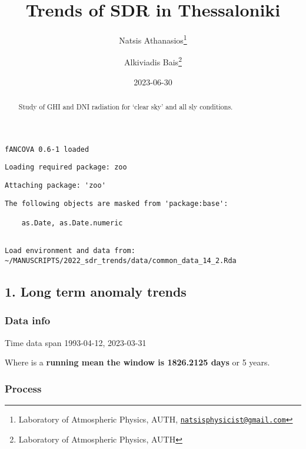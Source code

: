 \documentclass[
  10pt,
  a4paper,oneside]{article}
\title{Trends of SDR in Thessaloniki}
\author{Natsis Athanasios\footnote{Laboratory of Atmospheric Physics, AUTH, \href{mailto:natsisphysicist@gmail.com}{\nolinkurl{natsisphysicist@gmail.com}}} \and Alkiviadis Bais\footnote{Laboratory of Atmospheric Physics, AUTH}}
\date{2023-06-30}
\begin{document}
\maketitle
\begin{abstract}
Study of GHI and DNI radiation for `clear sky' and all sly conditions.
\end{abstract}

{
\hypersetup{linkcolor=}
\setcounter{tocdepth}{4}
\tableofcontents
}
\begin{verbatim}
fANCOVA 0.6-1 loaded
\end{verbatim}

\begin{verbatim}
Loading required package: zoo
\end{verbatim}

\begin{verbatim}
Attaching package: 'zoo'
\end{verbatim}

\begin{verbatim}
The following objects are masked from 'package:base':

    as.Date, as.Date.numeric
\end{verbatim}

\begin{verbatim}

Load environment and data from:  ~/MANUSCRIPTS/2022_sdr_trends/data/common_data_14_2.Rda 
\end{verbatim}

\hypertarget{long-term-anomaly-trends}{%
\subsection{1. Long term anomaly trends}\label{long-term-anomaly-trends}}

\hypertarget{data-info}{%
\subsubsection{Data info}\label{data-info}}

Time data span 1993-04-12, 2023-03-31

Where is a \textbf{running mean the window is 1826.2125 days} or
5 years.

\hypertarget{process}{%
\subsubsection{Process}\label{process}}
\end{document}
